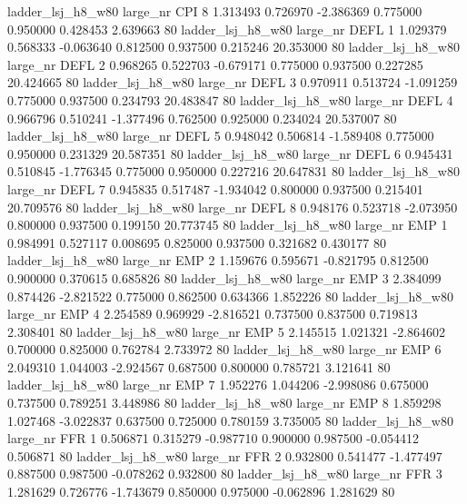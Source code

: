   ladder_lsj_h8_w80   large_nr      CPI                 8  1.313493  0.726970  -2.386369 0.775000 0.950000  0.428453    2.639663 80
  ladder_lsj_h8_w80   large_nr     DEFL                 1  1.029379  0.568333  -0.063640 0.812500 0.937500  0.215246   20.353000 80
  ladder_lsj_h8_w80   large_nr     DEFL                 2  0.968265  0.522703  -0.679171 0.775000 0.937500  0.227285   20.424665 80
  ladder_lsj_h8_w80   large_nr     DEFL                 3  0.970911  0.513724  -1.091259 0.775000 0.937500  0.234793   20.483847 80
  ladder_lsj_h8_w80   large_nr     DEFL                 4  0.966796  0.510241  -1.377496 0.762500 0.925000  0.234024   20.537007 80
  ladder_lsj_h8_w80   large_nr     DEFL                 5  0.948042  0.506814  -1.589408 0.775000 0.950000  0.231329   20.587351 80
  ladder_lsj_h8_w80   large_nr     DEFL                 6  0.945431  0.510845  -1.776345 0.775000 0.950000  0.227216   20.647831 80
  ladder_lsj_h8_w80   large_nr     DEFL                 7  0.945835  0.517487  -1.934042 0.800000 0.937500  0.215401   20.709576 80
  ladder_lsj_h8_w80   large_nr     DEFL                 8  0.948176  0.523718  -2.073950 0.800000 0.937500  0.199150   20.773745 80
  ladder_lsj_h8_w80   large_nr      EMP                 1  0.984991  0.527117   0.008695 0.825000 0.937500  0.321682    0.430177 80
  ladder_lsj_h8_w80   large_nr      EMP                 2  1.159676  0.595671  -0.821795 0.812500 0.900000  0.370615    0.685826 80
  ladder_lsj_h8_w80   large_nr      EMP                 3  2.384099  0.874426  -2.821522 0.775000 0.862500  0.634366    1.852226 80
  ladder_lsj_h8_w80   large_nr      EMP                 4  2.254589  0.969929  -2.816521 0.737500 0.837500  0.719813    2.308401 80
  ladder_lsj_h8_w80   large_nr      EMP                 5  2.145515  1.021321  -2.864602 0.700000 0.825000  0.762784    2.733972 80
  ladder_lsj_h8_w80   large_nr      EMP                 6  2.049310  1.044003  -2.924567 0.687500 0.800000  0.785721    3.121641 80
  ladder_lsj_h8_w80   large_nr      EMP                 7  1.952276  1.044206  -2.998086 0.675000 0.737500  0.789251    3.448986 80
  ladder_lsj_h8_w80   large_nr      EMP                 8  1.859298  1.027468  -3.022837 0.637500 0.725000  0.780159    3.735005 80
  ladder_lsj_h8_w80   large_nr      FFR                 1  0.506871  0.315279  -0.987710 0.900000 0.987500 -0.054412    0.506871 80
  ladder_lsj_h8_w80   large_nr      FFR                 2  0.932800  0.541477  -1.477497 0.887500 0.987500 -0.078262    0.932800 80
  ladder_lsj_h8_w80   large_nr      FFR                 3  1.281629  0.726776  -1.743679 0.850000 0.975000 -0.062896    1.281629 80
